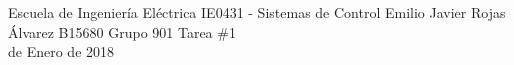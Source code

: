 \documentclass{ucrEieTarea}
\begin{document}
    {Escuela de Ingeniería Eléctrica}
    {IE0431 - Sistemas de Control}
    {Emilio Javier Rojas Álvarez}
    {B15680}
    {Grupo 901}
    {Tarea \#1\\{\footnotesize{} de Enero de 2018}}
  
  
  \newpage
  
  \newpage
  
  \newpage
  
  \newpage
  
\end{document}
